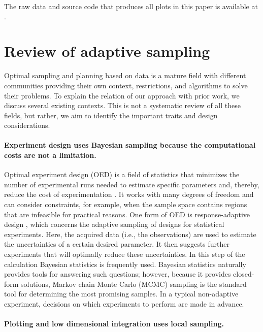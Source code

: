 The raw data and source code that produces all plots in this paper is available at \cite{papercode}.

\hypertarget{sec:review}{%
\section{Review of adaptive sampling}\label{sec:review}}

Optimal sampling and planning based on data is a mature field with different communities providing their own context, restrictions, and algorithms to solve their problems.
To explain the relation of our approach with prior work, we discuss several existing contexts.
This is not a systematic review of all these fields, but rather, we aim to identify the important traits and design considerations.

\hypertarget{experiment-design-uses-bayesian-sampling-because-the-computational-costs-are-not-a-limitation.}{%
\paragraph{Experiment design uses Bayesian sampling because the computational costs are not a limitation.}\label{experiment-design-uses-bayesian-sampling-because-the-computational-costs-are-not-a-limitation.}}

Optimal experiment design (OED) is a field of statistics that minimizes the number of experimental runs needed to estimate specific parameters and, thereby, reduce the cost of experimentation \cite{Emery1998}.
It works with many degrees of freedom and can consider constraints, for example, when the sample space contains regions that are infeasible for practical reasons.
One form of OED is response-adaptive design \cite{Hu2006}, which concerns the adaptive sampling of designs for statistical experiments.
Here, the acquired data (i.e., the observations) are used to estimate the uncertainties of a certain desired parameter.
It then suggests further experiments that will optimally reduce these uncertainties.
In this step of the calculation Bayesian statistics is frequently used.
Bayesian statistics naturally provides tools for answering such questions; however, because it provides closed-form solutions, Markov chain Monte Carlo (MCMC) sampling is the standard tool for determining the most promising samples.
In a typical non-adaptive experiment, decisions on which experiments to perform are made in advance.

\hypertarget{plotting-and-low-dimensional-integration-uses-local-sampling.}{%
\paragraph{Plotting and low dimensional integration uses local sampling.}\label{plotting-and-low-dimensional-integration-uses-local-sampling.}}

